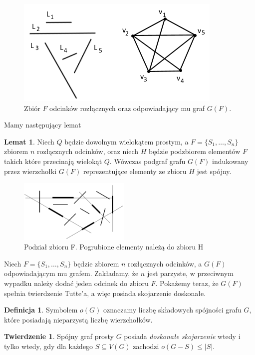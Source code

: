 \documentclass[brudnopis]{xmgr}
\theoremstyle{definition}
\newtheorem{Twierdzenie}{Twierdzenie}
\newtheorem{Lemat}{Lemat}
\newtheorem{Definicja}{Definicja}
\begin{document}
\begin{figure}[ht!]\label{zbior odcinkow rozlacznych}
 \centering
  \includegraphics{rysunki/g_f.png}
  \caption{Zbiór $F$ odcinków rozłącznych oraz odpowiadający mu graf $G(F)$.}
\end{figure} 

Mamy następujący lemat
\begin{Lemat}\label{podgraf indukowany} \cite{illumination}
Niech $Q$ będzie dowolnym wielokątem prostym, a $F = \{S_1,\ldots,S_n\}$ zbiorem $n$ rozłącznych odcinków, oraz niech $H$ będzie podzbiorem elementów $F$ takich które przecinają wielokąt $Q$. Wówczas podgraf grafu $G(F)$ indukowany przez wierzchołki $G(F)$ reprezentujące elementy ze zbioru $H$ jest spójny.
\end{Lemat}
\begin{figure}[ht!]
 \centering
  \includegraphics[height=3cm]{rysunki/podzial_h.png}
  \caption{Podział zbioru F. Pogrubione elementy należą do zbioru H}
\end{figure} 
Niech $F = \{S_1,\ldots,S_n\}$ będzie zbiorem $n$ rozłącznych odcinków, a $G(F)$ odpowiadającym mu grafem. Zakładamy, że $n$ jest parzyste, w przeciwnym wypadku należy dodać jeden odcinek do zbioru $F$. Pokażemy teraz, że $G(F)$ spełnia twierdzenie Tutte'a, a więc posiada skojarzenie doskonałe.
\begin{Definicja}
	Symbolem $o(G)$ oznaczamy liczbę składowych spójności grafu $G$, które posiadają nieparzystą liczbę wierzchołków.
\end{Definicja}
\begin{Twierdzenie} \cite{tutte}
	Spójny graf prosty $G$ posiada \emph{doskonałe skojarzenie} wtedy i tylko wtedy, gdy dla każdego $S \subseteq V(G)$ zachodzi $o(G-S) \le |S|$.
\end{Twierdzenie}
\end{document}
